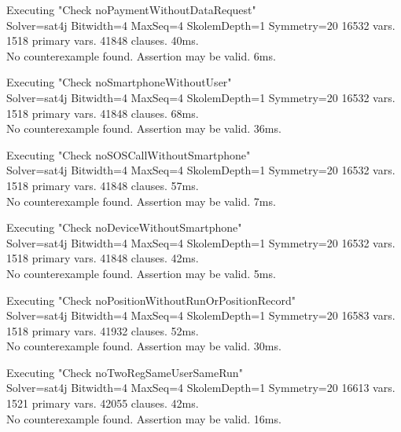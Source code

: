    \vspace{1cm}

   Executing "Check noPaymentWithoutDataRequest" \\ \noindent
      Solver=sat4j Bitwidth=4 MaxSeq=4 SkolemDepth=1 Symmetry=20
      16532 vars. 1518 primary vars. 41848 clauses. 40ms. \\ \noindent
      No counterexample found. Assertion may be valid. 6ms.

   \vspace{1cm}

   Executing "Check noSmartphoneWithoutUser" \\ \noindent
      Solver=sat4j Bitwidth=4 MaxSeq=4 SkolemDepth=1 Symmetry=20
      16532 vars. 1518 primary vars. 41848 clauses. 68ms. \\ \noindent
      No counterexample found. Assertion may be valid. 36ms.

   \vspace{1cm}

   Executing "Check noSOSCallWithoutSmartphone" \\ \noindent
      Solver=sat4j Bitwidth=4 MaxSeq=4 SkolemDepth=1 Symmetry=20
      16532 vars. 1518 primary vars. 41848 clauses. 57ms. \\ \noindent
      No counterexample found. Assertion may be valid. 7ms.

   \vspace{1cm}

   Executing "Check noDeviceWithoutSmartphone" \\ \noindent
      Solver=sat4j Bitwidth=4 MaxSeq=4 SkolemDepth=1 Symmetry=20
      16532 vars. 1518 primary vars. 41848 clauses. 42ms. \\ \noindent
      No counterexample found. Assertion may be valid. 5ms.

   \vspace{1cm}

   Executing "Check noPositionWithoutRunOrPositionRecord" \\ \noindent
      Solver=sat4j Bitwidth=4 MaxSeq=4 SkolemDepth=1 Symmetry=20
      16583 vars. 1518 primary vars. 41932 clauses. 52ms. \\ \noindent
      No counterexample found. Assertion may be valid. 30ms.

   \vspace{1cm}

   Executing "Check noTwoRegSameUserSameRun" \\ \noindent
      Solver=sat4j Bitwidth=4 MaxSeq=4 SkolemDepth=1 Symmetry=20
      16613 vars. 1521 primary vars. 42055 clauses. 42ms. \\ \noindent
      No counterexample found. Assertion may be valid. 16ms.

